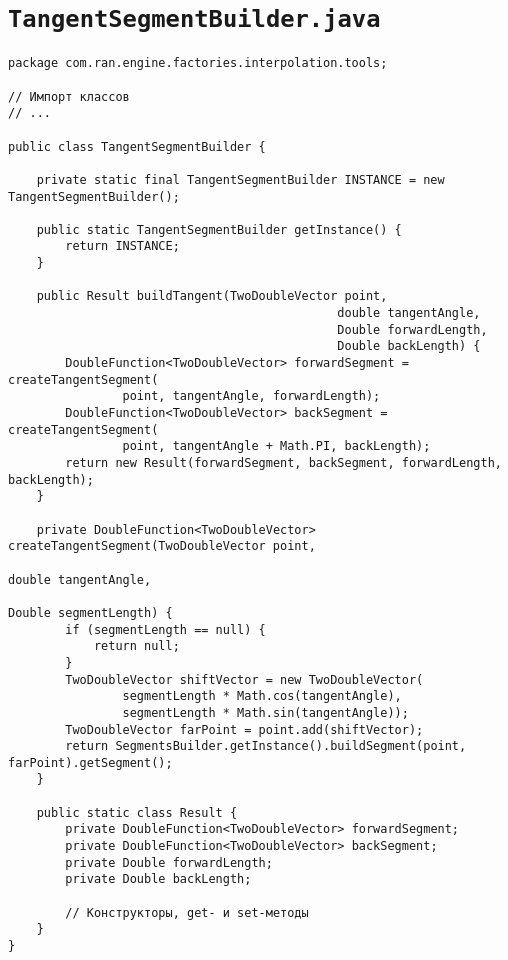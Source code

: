 \section*{\texttt{TangentSegmentBuilder.java}}
\begin{verbatim}
package com.ran.engine.factories.interpolation.tools;

// Импорт классов
// ...

public class TangentSegmentBuilder {

    private static final TangentSegmentBuilder INSTANCE = new TangentSegmentBuilder();

    public static TangentSegmentBuilder getInstance() {
        return INSTANCE;
    }

    public Result buildTangent(TwoDoubleVector point,
                                              double tangentAngle,
                                              Double forwardLength,
                                              Double backLength) {
        DoubleFunction<TwoDoubleVector> forwardSegment = createTangentSegment(
                point, tangentAngle, forwardLength);
        DoubleFunction<TwoDoubleVector> backSegment = createTangentSegment(
                point, tangentAngle + Math.PI, backLength);
        return new Result(forwardSegment, backSegment, forwardLength, backLength);
    }

    private DoubleFunction<TwoDoubleVector> createTangentSegment(TwoDoubleVector point,
                                                                 double tangentAngle,
                                                                 Double segmentLength) {
        if (segmentLength == null) {
            return null;
        }
        TwoDoubleVector shiftVector = new TwoDoubleVector(
                segmentLength * Math.cos(tangentAngle),
                segmentLength * Math.sin(tangentAngle));
        TwoDoubleVector farPoint = point.add(shiftVector);
        return SegmentsBuilder.getInstance().buildSegment(point, farPoint).getSegment();
    }

    public static class Result {
        private DoubleFunction<TwoDoubleVector> forwardSegment;
        private DoubleFunction<TwoDoubleVector> backSegment;
        private Double forwardLength;
        private Double backLength;

        // Конструкторы, get- и set-методы
    }
}
\end{verbatim}

